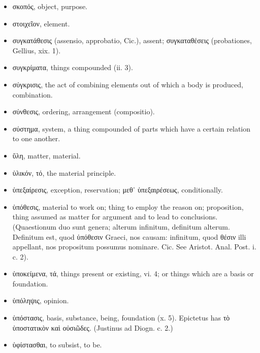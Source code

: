 \begin{itemize}[leftmargin=*]
\setlength\itemsep{0em}
\item
  \textgreek{σκοπός}, object, purpose.
\item
  \textgreek{στοιχεῖον}, element.
\item
  \textgreek{συγκατάθεσις} (assensio, approbatio, Cic.), assent; \textgreek{συγκαταθέσεις}
  (probationes, Gellius, xix. 1).
\item
  \textgreek{συγκρίματα}, things compounded (ii. 3).
\item
  \textgreek{σύγκρισις}, the act of combining elements out of which a body is
  produced, combination.
\item
  \textgreek{σύνθεσις}, ordering, arrangement (compositio).
\item
  \textgreek{σύστημα}, system, a thing compounded of parts which have a certain
  relation to one another.
\end{itemize}

\begin{itemize}[leftmargin=*]
\setlength\itemsep{0em}
\item
  \textgreek{ὕλη}, matter, material.
\item
  \textgreek{ὑλικόν, τό}, the material principle.
\item
  \textgreek{ὑπεξαίρεσις}, exception, reservation; \textgreek{μεθ᾽ ὑπεξαιρέσεως}, conditionally.
\item
  \textgreek{ὑπόθεσις}, material to work on; thing to employ the reason on;
  proposition, thing assumed as matter for argument and to lead to
  conclusions. (Quaestionum duo sunt genera; alterum infinitum,
  definitum alterum. Definitum est, quod \textgreek{ὑπόθεσιν} Graeci, nos causam:
  infinitum, quod \textgreek{θέσιν} illi appellant, nos propositum possumus
  nominare. Cic. See Aristot. Anal. Post. i. c. 2).
\item
  \textgreek{ὑποκείμενα, τά}, things present or existing, vi. 4; or things which are
  a basis or foundation.
\item
  \textgreek{ὑπόληψις}, opinion.
\item
  \textgreek{ὑπόστασις}, basis, substance, being, foundation (x. 5). Epictetus has
  \textgreek{τὸ ὑποστατικὸν καὶ οὐσιῶδες}. (Justinus ad Diogn. c. 2.)
\item
  \textgreek{ὑφίστασθαι}, to subsist, to be.
\end{itemize}


